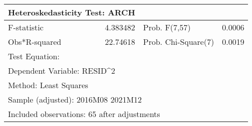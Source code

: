 \begin{tabular}{lrrrr}
\toprule
\multicolumn{2}{l}{Heteroskedasticity Test: ARCH}&\multicolumn{1}{c}{}&\multicolumn{1}{c}{}&\multicolumn{1}{c}{}\\
\midrule
\multicolumn{1}{l}{F-statistic}&\multicolumn{1}{r}{4.383482}&\multicolumn{2}{l}{Prob. F(7,57)}&\multicolumn{1}{r}{0.0006}\\
\multicolumn{1}{l}{Obs*R-squared}&\multicolumn{1}{r}{22.74618}&\multicolumn{2}{l}{Prob. Chi-Square(7)}&\multicolumn{1}{r}{0.0019}\\
\midrule
\multicolumn{1}{l}{Test Equation:}&\multicolumn{1}{c}{}&\multicolumn{1}{c}{}&\multicolumn{1}{c}{}&\multicolumn{1}{c}{}\\
\multicolumn{2}{l}{Dependent Variable: RESID\textasciicircum 2}&\multicolumn{1}{c}{}&\multicolumn{1}{c}{}&\multicolumn{1}{c}{}\\
\multicolumn{2}{l}{Method: Least Squares}&\multicolumn{1}{c}{}&\multicolumn{1}{c}{}&\multicolumn{1}{c}{}\\
\multicolumn{3}{l}{Sample (adjusted): 2016M08 2021M12}&\multicolumn{1}{c}{}&\multicolumn{1}{c}{}\\
\multicolumn{4}{l}{Included observations: 65 after adjustments}&\multicolumn{1}{c}{}\\
\bottomrule
\end{tabular}
